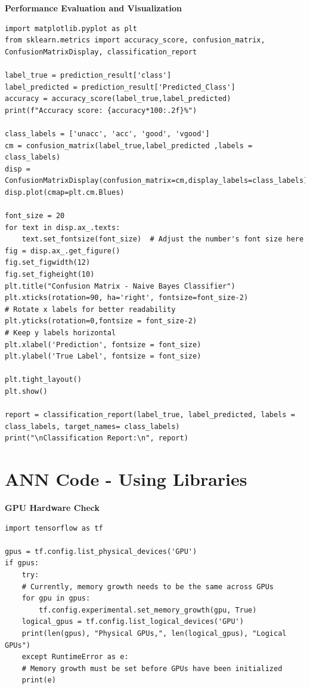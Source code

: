 \documentclass[a4paper]{article}
\begin{document}
\textbf{Performance Evaluation and Visualization}
\begin{lstlisting}
import matplotlib.pyplot as plt 
from sklearn.metrics import accuracy_score, confusion_matrix, ConfusionMatrixDisplay, classification_report

label_true = prediction_result['class']
label_predicted = prediction_result['Predicted_Class']
accuracy = accuracy_score(label_true,label_predicted)
print(f"Accuracy score: {accuracy*100:.2f}%")

class_labels = ['unacc', 'acc', 'good', 'vgood']
cm = confusion_matrix(label_true,label_predicted ,labels = class_labels)
disp = ConfusionMatrixDisplay(confusion_matrix=cm,display_labels=class_labels)
disp.plot(cmap=plt.cm.Blues)

font_size = 20
for text in disp.ax_.texts:
    text.set_fontsize(font_size)  # Adjust the number's font size here
fig = disp.ax_.get_figure()
fig.set_figwidth(12)
fig.set_figheight(10) 
plt.title("Confusion Matrix - Naive Bayes Classifier")
plt.xticks(rotation=90, ha='right', fontsize=font_size-2)                     # Rotate x labels for better readability
plt.yticks(rotation=0,fontsize = font_size-2)                                  # Keep y labels horizontal
plt.xlabel('Prediction', fontsize = font_size)
plt.ylabel('True Label', fontsize = font_size)

plt.tight_layout()
plt.show()

report = classification_report(label_true, label_predicted, labels = class_labels, target_names= class_labels)
print("\nClassification Report:\n", report)
\end{lstlisting}

\newpage
\section{ANN Code - Using Libraries}
\textbf{GPU Hardware Check}
\begin{lstlisting}
import tensorflow as tf

gpus = tf.config.list_physical_devices('GPU')
if gpus:
    try:
    # Currently, memory growth needs to be the same across GPUs
    for gpu in gpus:
        tf.config.experimental.set_memory_growth(gpu, True)
    logical_gpus = tf.config.list_logical_devices('GPU')
    print(len(gpus), "Physical GPUs,", len(logical_gpus), "Logical GPUs")
    except RuntimeError as e:
    # Memory growth must be set before GPUs have been initialized
    print(e)
\end{lstlisting}
\end{document}
